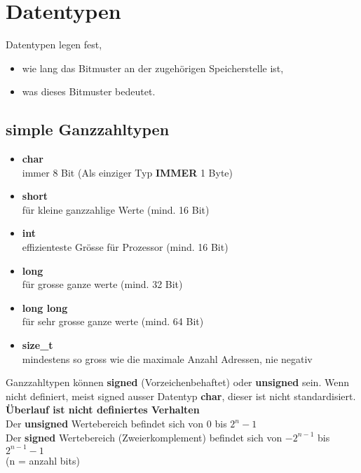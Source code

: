 \section{Datentypen}

Datentypen legen fest,

\begin{itemize}[itemsep=1pt, parsep=0pt]
    \item wie lang das Bitmuster an der zugehörigen Speicherstelle ist,
    \item was dieses Bitmuster bedeutet.
\end{itemize}

\subsection{simple Ganzzahltypen}

\begin{itemize}[itemsep=1pt, parsep=0pt]
    \item \textbf{char} \\ immer 8 Bit (Als einziger Typ \textbf{IMMER} 1 Byte)
    \item \textbf{short} \\ für kleine ganzzahlige Werte (mind. 16 Bit)
    \item \textbf{int} \\ effizienteste Grösse für Prozessor (mind. 16 Bit)
    \item \textbf{long} \\ für grosse ganze werte (mind. 32 Bit)
    \item \textbf{long long} \\ für sehr grosse ganze werte (mind. 64 Bit)   
    \item \textbf{size\_t} \\ mindestens so gross wie die maximale Anzahl Adressen, nie negativ
\end{itemize}

Ganzzahltypen können \textbf{signed} (Vorzeichenbehaftet) oder \textbf{unsigned} sein. Wenn nicht definiert, meist signed ausser Datentyp \textbf{char}, dieser ist nicht standardisiert.\\
\textbf{Überlauf ist nicht definiertes Verhalten}\\
Der \textbf{unsigned} Wertebereich befindet sich von 0 bis $2^n -1 $\\
Der \textbf{signed} Wertebereich (Zweierkomplement) befindet sich von $-2^{n-1}$ bis $2^{n-1} -1 $\\
(n = anzahl bits)

